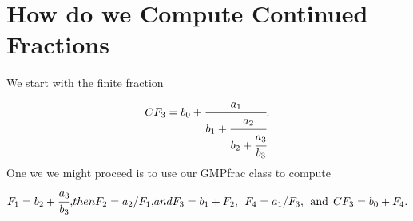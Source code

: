 \documentclass[12pt]{article}
\numberwithin{equation}{section}
\numberwithin{figure}{section}
\numberwithin{figure}{section}
\numberwithin{equation}{section}
\begin{document}
\section{How do we Compute Continued Fractions}


We start with the finite fraction
\begin{equation}
CF_{3}=b_0 +\cfrac{a_1}{b_1+\cfrac{a_2}{b_2+\cfrac{a_3}{b_3}}}.
\end{equation}
One we we might proceed is to use our GMPfrac class to compute
\begin{equation}
F_1=b_2+\cfrac{a_3}{b_3},
$$ then  $$
F_2 = a_2/F_1,
$$  and $$
F_3=b_1+F_2, \> \> F_4=a_1/F_3, \> \> {\rm and} \> \> CF_3=b_0+F_4.
\end{equation}
\end{document}
